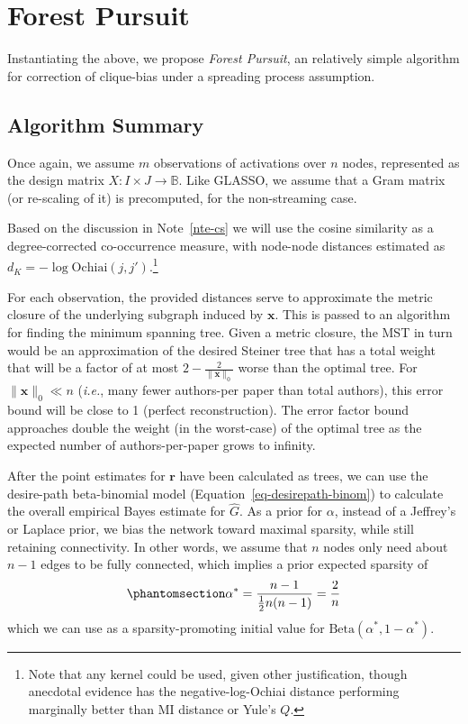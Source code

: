 \documentclass[%
	12pt,
		oneside,
		letterpaper
]{book}
\begin{document}
\section{Forest Pursuit}\label{sec-FP}

Instantiating the above, we propose \emph{Forest Pursuit}, an relatively simple algorithm for correction of clique-bias under a spreading process assumption.

\subsection{Algorithm Summary}\label{algorithm-summary}

Once again, we assume \(m\) observations of activations over \(n\) nodes, represented as the design matrix \(X:I\times J \rightarrow \mathbb{B}\).
Like GLASSO, we assume that a Gram matrix (or re-scaling of it) is precomputed, for the non-streaming case.

Based on the discussion in Note~\ref{nte-cs} we will use the cosine similarity as a degree-corrected co-occurrence measure, with node-node distances estimated as \(d_K=-\log{\text{Ochiai}(j,j')}\).\footnote{
  Note that any kernel could be used, given other justification, though anecdotal evidence has the negative-log-Ochiai distance performing marginally better than MI distance or Yule's \(Q\).}

For each observation, the provided distances serve to approximate the metric closure of the underlying subgraph induced by \(\mathbf{x}\).
This is passed to an algorithm for finding the minimum spanning tree.
Given a metric closure, the MST in turn would be an approximation of the desired Steiner tree that has a total weight that will be a factor of at most \(2-\tfrac{2}{\|\mathbf{x}\|_0}\) worse than the optimal tree.\autocite{fastalgorithmSteiner_Kou1981}
For \(\|\mathbf{x}\|_0 \ll n\) (\emph{i.e.}, many fewer authors-per paper than total authors), this error bound will be close to 1 (perfect reconstruction).
The error factor bound approaches double the weight (in the worst-case) of the optimal tree as the expected number of authors-per-paper grows to infinity.

After the point estimates for \(\mathbf{r}\) have been calculated as trees, we can use the desire-path beta-binomial model (Equation~\ref{eq-desirepath-binom}) to calculate the overall empirical Bayes estimate for \(\hat{G}\).
As a prior for \(\alpha\), instead of a Jeffrey's or Laplace prior, we bias the network toward maximal sparsity, while still retaining connectivity.
In other words, we assume that \(n\) nodes only need about \(n-1\) edges to be fully connected, which implies a prior expected sparsity of
\begin{equation}\phantomsection\label{eq-min-connect}{
\alpha^*=\frac{n-1}{\tfrac{1}{2}n(n-1)} = \frac{2}{n}
}\end{equation}
which we can use as a sparsity-promoting initial value for \(\text{Beta}(\alpha^*,1-\alpha^*)\).
\end{document}
